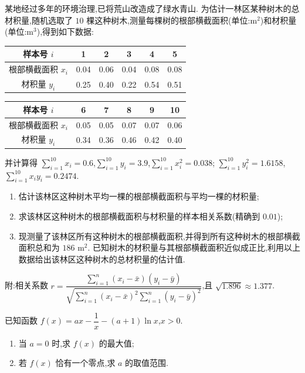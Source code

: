 \begin{problem}
某地经过多年的环境治理,已将荒山改造成了绿水青山. 为估计一林区某种树木的总材积量,随机选取了 \(10\) 棵这种树木,测量每棵树的根部横截面积(单位:\(\text{m}^2\))和材积量(单位:\(\text{m}^3\)),得到如下数据:

\begin{center}
\begin{tabular}{c|ccccc}
样本号 \(i\) & 1 & 2 & 3 & 4 & 5 \\\hline
根部横截面积 \(x_i\) & 0.04 & 0.06 & 0.04 & 0.08 & 0.08 \\
材积量 \(y_i\) & 0.25 & 0.40 & 0.22 & 0.54 & 0.51 \\
\end{tabular}

\vspace{0.5em}

\begin{tabular}{c|cccc|c}
样本号 \(i\) & 6 & 7 & 8 & 9 & 10 \\\hline
根部横截面积 \(x_i\) & 0.05 & 0.05 & 0.07 & 0.07 & 0.06 \\
材积量 \(y_i\) & 0.34 & 0.36 & 0.46 & 0.42 & 0.40 \\
\end{tabular}
\end{center}

并计算得 \(\sum_{i=1}^{10}x_i=0.6\),\(\sum_{i=1}^{10}y_i=3.9\),\(\sum_{i=1}^{10}x_i^2=0.038\);
\(\sum_{i=1}^{10}y_i^2=1.6158\),\(\sum_{i=1}^{10}x_iy_i=0.2474\).

\begin{enumerate}
\item 估计该林区这种树木平均一棵的根部横截面积与平均一棵的材积量;
\item 求该林区这种树木的根部横截面积与材积量的样本相关系数(精确到 \(0.01\));
\item 现测量了该林区所有这种树木的根部横截面积,并得到所有这种树木的根部横截面积总和为 \(186\text{ m}^2\). 已知树木的材积量与其根部横截面积近似成正比,利用以上数据给出该林区这种树木的总材积量的估计值.
\end{enumerate}

附:相关系数 \(r=\dfrac{\sum_{i=1}^n(x_i-\bar{x})(y_i-\bar{y})}{\sqrt{\sum_{i=1}^n(x_i-\bar{x})^2\sum_{i=1}^n(y_i-\bar{y})^2}}\),且 \(\sqrt{1.896}\approx1.377\).
\end{problem}

\begin{problem}
已知函数 \(f(x)=ax-\dfrac{1}{x}-(a+1)\ln x\),\(x>0\).

\begin{enumerate}
    \item 当 \(a=0\) 时,求 \(f(x)\) 的最大值;
    \item 若 \(f(x)\) 恰有一个零点,求 \(a\) 的取值范围.
\end{enumerate}
\end{problem}


